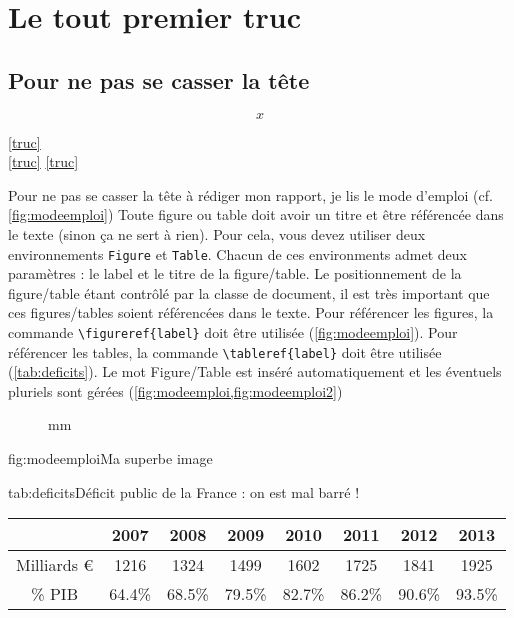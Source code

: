 \documentclass[overfullbox]{polytech}
\begin{document}
\chapter{Le tout premier truc}
\label{chap:toutpremier}

\lipsum[1]


\section{Pour ne pas se casser la tête}

\label{sec:cassetete}


\begin{equation}
\label{truc}
x
\end{equation}

\autoref{truc}\\
\ref{truc}
\eqref{truc}

Pour ne pas se casser la tête à rédiger mon rapport, je lis le mode d'emploi (cf. \ref{fig:modeemploi})
Toute figure ou table doit avoir un titre et être référencée dans le texte (sinon ça ne sert à rien).
Pour cela, vous devez utiliser deux environnements \texttt{Figure} et \texttt{Table}. Chacun de ces environments admet deux paramètres : le label et le titre de la figure/table. Le positionnement de la figure/table étant contrôlé par la classe de document, il est très important que ces figures/tables soient référencées dans le texte. Pour référencer les figures, la commande \texttt{\textbackslash{}figureref\{label\}} doit être utilisée (\ref{fig:modeemploi}).
Pour référencer les tables, la commande \texttt{\textbackslash{}tableref\{label\}} doit être utilisée (\ref{tab:deficits}). Le mot Figure/Table est inséré automatiquement et les éventuels pluriels sont gérées (\ref{fig:modeemploi,fig:modeemploi2})

\begin{figure}
mm
\end{figure}

\begin{Figure}{fig:modeemploi}{Ma superbe image}
\end{Figure}

\begin{Table}{tab:deficits}{Déficit public de la France : on est mal barré !}
\begin{tabu}{cccccccc}
	&2007	&2008	&2009	&2010	&2011	&2012	&2013\\\hline
Milliards \euro&1216	&1324	&1499	&1602	&1725	&1841	&1925\\\hline
\% PIB	&64.4\%	&68.5\%	&79.5\%	&82.7\%	&86.2\%	&90.6\%	&93.5\%\\\hline
\end{tabu}
\end{Table}
\end{document}
